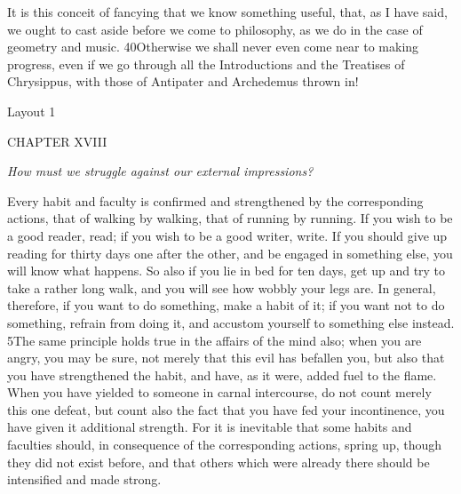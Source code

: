 It is this conceit of fancying that we know something useful, that, as I have said, we ought to cast aside before we come to philosophy, as we do in the case of geometry and music. 40Otherwise we shall never even come near to making progress, even if we go through all the Introductions and the Treatises of Chrysippus, with those of Antipater and Archedemus thrown in!



Layout 1

CHAPTER XVIII

\emph{How must we struggle against our external impressions?}

Every habit and faculty is confirmed and strengthened by the corresponding actions, that of walking by walking, that of running by running. If you wish to be a good reader, read; if you wish to be a good writer, write. If you should give up reading for thirty days one after the other, and be engaged in something else, you will know what happens. So also if you lie in bed for ten days, get up and try to take a rather long walk, and you will see how wobbly your legs are. In general, therefore, if you want to do something, make a habit of it; if you want not to do something, refrain from doing it, and accustom yourself to something else instead. 5The same principle holds true in the affairs of the mind also; when you are angry, you may be sure, not merely that this evil has befallen you, but also that you have strengthened the habit, and have, as it were, added fuel to the flame. When you have yielded to someone in carnal intercourse, do not count merely this one defeat, but count also the fact that you have fed your incontinence, you have given it additional strength. For it is inevitable that some habits and faculties should, in consequence of the corresponding actions, spring up, though they did not exist before, and that others which were already there should be intensified and made strong.

